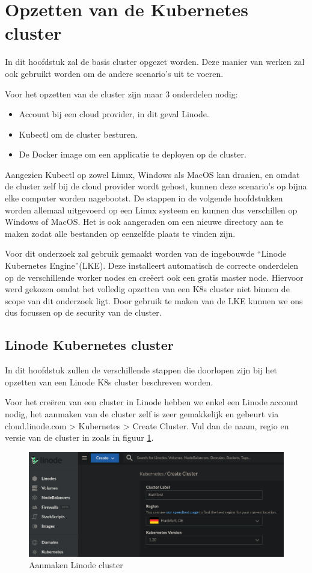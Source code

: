 \section{Opzetten van de Kubernetes cluster}
In dit hoofdstuk zal de basis cluster opgezet worden. Deze manier van werken zal ook gebruikt worden om de andere scenario's uit te voeren.

Voor het opzetten van de cluster zijn maar 3 onderdelen nodig:
\begin{itemize}
\item Account bij een cloud provider, in dit geval Linode.
\item Kubectl om de cluster besturen.
\item De Docker image om een applicatie te deployen op de cluster.
\end{itemize}

Aangezien Kubectl op zowel Linux, Windows als MacOS kan draaien, en omdat de cluster zelf bij de cloud provider wordt gehost, kunnen deze scenario's op bijna elke computer worden nagebootst. De stappen in de volgende hoofdstukken worden allemaal uitgevoerd op een Linux systeem en kunnen dus verschillen op Windows of MacOS. Het is ook aangeraden om een nieuwe directory aan te maken zodat alle bestanden op eenzelfde plaats te vinden zijn.

Voor dit onderzoek zal gebruik gemaakt worden van de ingebouwde ``Linode Kubernetes Engine''(LKE). Deze installeert automatisch de correcte onderdelen op de verschillende worker nodes en creëert ook een gratis master node. Hiervoor werd gekozen omdat het volledig opzetten van een K8s cluster niet binnen de scope van dit onderzoek ligt. Door gebruik te maken van de LKE kunnen we ons dus focussen op de security van de cluster. 

\subsection{Linode Kubernetes cluster}
In dit hoofdstuk zullen de verschillende stappen die doorlopen zijn bij het opzetten van een Linode K8s cluster beschreven worden.

Voor het creëren van een cluster in Linode hebben we enkel een Linode account nodig, het aanmaken van de cluster zelf is zeer gemakkelijk en gebeurt via cloud.linode.com > Kubernetes > Create Cluster. Vul dan de naam, regio en versie van de cluster in zoals in figuur \ref{fig:LinodeNaam}.

\begin{figure}[ht]
	\centering
	\includegraphics[width=\linewidth]{img/LinodeClusterNaam.png}
	\caption{Aanmaken Linode cluster}
	\label{fig:LinodeNaam}
\end{figure}

